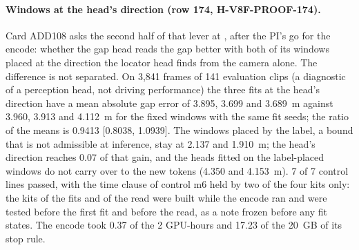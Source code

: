 \paragraph{Windows at the head's direction (row 174, H-V8F-PROOF-174).} Card ADD108 asks the second half of that lever at , after the PI's go for the encode: whether the gap head reads the gap better with both of its windows placed at the direction the locator head finds from the camera alone. The difference is not separated. On 3,841 frames of 141 evaluation clips (a diagnostic of a perception head, not driving performance) the three fits at the head's direction have a mean absolute gap error of 3.895, 3.699 and 3.689~m against 3.960, 3.913 and 4.112~m for the fixed windows with the same fit seeds; the ratio of the means is 0.9413 [0.8038, 1.0939]. The windows placed by the label, a bound that is not admissible at inference, stay at 2.137 and 1.910~m; the head's direction reaches 0.07 of that gain, and the heads fitted on the label-placed windows do not carry over to the new tokens (4.350 and 4.153~m). 7 of 7 control lines passed, with the time clause of control m6 held by two of the four kits only: the kits of the fits and of the read were built while the encode ran and were tested before the first fit and before the read, as a note frozen before any fit states. The encode took 0.37 of the 2 GPU-hours and 17.23 of the 20~GB of its stop rule.